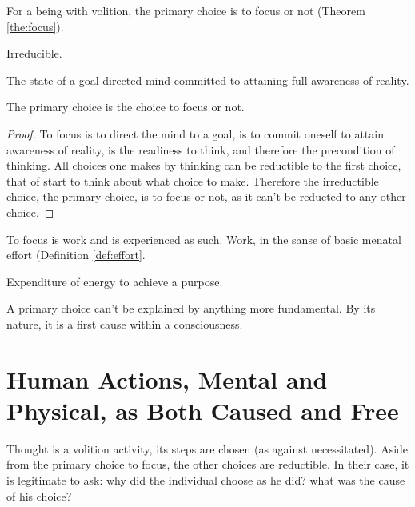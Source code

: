         For a being with volition, the primary choice is to focus or not (Theorem \ref{the:focus}).

            \begin{definition}[Primary]
            \label{def:primary}
                Irreducible.
            \end{definition}

            \begin{definition}[Focus]
            \label{def:focus}
                The state of a goal-directed mind committed to attaining full awareness of reality.
            \end{definition}

            \begin{theorem}
            \label{the:focus}
                The primary choice is the choice to focus or not.
            \end{theorem}

            \begin{proof}
                To focus is to direct the mind to a goal, is to commit oneself to attain awareness of reality, is the readiness to think, and therefore the precondition of thinking. All choices one makes by thinking can be reductible to the first choice, that of start to think about what choice to make. Therefore the irreductible choice, the primary choice, is to focus or not, as it can't be reducted to any other choice.
            \end{proof}

        To focus is work and is experienced as such. Work, in the sanse of basic menatal effort (Definition \ref{def:effort}.

            \begin{definition}[Effort]
            \label{def:effort}
                Expenditure of energy to achieve a purpose.
            \end{definition}

        A primary choice can't be explained by anything more fundamental. By its nature, it is a first cause within a consciousness.

    \section{Human Actions, Mental and Physical, as Both Caused and Free}
    
        Thought is a volition activity, its steps are chosen (as against necessitated). Aside from the primary choice to focus, the other choices are reductible. In their case, it is legitimate to ask: why did the individual choose as he did? what was the cause of his choice?

